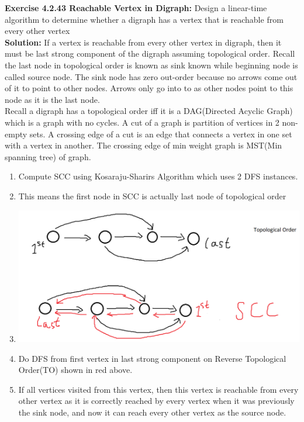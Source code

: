 \documentclass[11pt,fleqn]{article}
\newcommand{\be}{\begin{enumerate}}
\newcommand{\ee}{\end{enumerate}}
\begin{document}
\textbf{Exercise 4.2.43 Reachable Vertex in Digraph:} Design a linear-time algorithm to determine whether a digraph has a vertex that is reachable from every other vertex\\

\textbf{Solution:} If a vertex is reachable from every other vertex in digraph, then it must be last strong component of the digraph assuming topological order. Recall the last node in topological order is known as sink known while beginning node is called source node. The sink node has zero out-order because no arrows come out of it to point to other nodes. Arrows only go into to as other nodes point to this node as it is the last node.\\

Recall a digraph has a topological order iff it is a DAG(Directed Acyclic Graph) which is a graph with no cycles. A cut of a graph is partition of vertices in 2 non-empty sets. A crossing edge of a cut is an edge that connects a vertex in one set with a vertex in another. The crossing edge of min weight graph is MST(Min spanning tree) of graph.

\be
	\item Compute SCC using Kosaraju-Sharirs Algorithm which uses 2 DFS instances.
	\item This means the first node in SCC is actually last node of topological order
	\item \includegraphics[scale=0.4]{4.2.43.png}
	\item Do DFS from first vertex in last strong component on Reverse Topological Order(TO) shown in red above.
	\item If all vertices visited from this vertex, then this vertex is reachable from every other vertex as it is correctly reached by every vertex when it was previously the sink node, and now it can reach every other vertex as the source node.
\ee

\newpage
\end{document}
